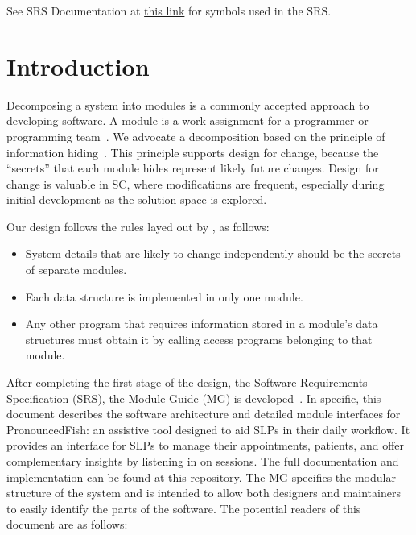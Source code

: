 \documentclass[12pt, titlepage]{article}
\begin{document}
See SRS Documentation at \href{https://github.com/lilyporter/Ghoti/blob/main/pdfs/SRS/SRS.pdf}{this link} for symbols used in the SRS.

\newpage

\tableofcontents

\listoftables

\listoffigures

\newpage


\section{Introduction}

Decomposing a system into modules is a commonly accepted approach to developing
software.  A module is a work assignment for a programmer or programming
team~\citep{ParnasEtAl1984}.  We advocate a decomposition
based on the principle of information hiding~\citep{Parnas1972a}.  This
principle supports design for change, because the ``secrets'' that each module
hides represent likely future changes.  Design for change is valuable in SC,
where modifications are frequent, especially during initial development as the
solution space is explored.

Our design follows the rules layed out by \citet{ParnasEtAl1984}, as follows:
\begin{itemize}
\item System details that are likely to change independently should be the
  secrets of separate modules.
\item Each data structure is implemented in only one module.
\item Any other program that requires information stored in a module's data
  structures must obtain it by calling access programs belonging to that module.
\end{itemize}
After completing the first stage of the design, the Software Requirements
Specification (SRS), the Module Guide (MG) is developed~\citep{ParnasEtAl1984}.
In specific, this document describes the software architecture and detailed module
interfaces for PronouncedFish: an assistive tool designed to 
aid SLPs in their daily workflow. It provides an interface for SLPs to manage 
their appointments, patients, and offer complementary insights by listening in on sessions. The full documentation and implementation can be found at \href{https://github.com/lilyporter/Ghoti/tree/main/}{this repository}. The MG
specifies the modular structure of the system and is intended to allow both
designers and maintainers to easily identify the parts of the software.  The
potential readers of this document are as follows:
\end{document}
